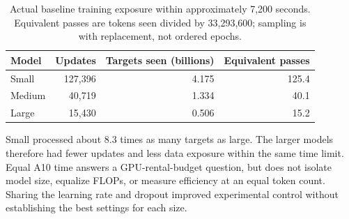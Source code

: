 \begin{table}[H]
\centering
\caption{Actual baseline training exposure within approximately 7,200 seconds. Equivalent passes are tokens seen divided by 33,293,600; sampling is with replacement, not ordered epochs.}
\begin{tabular}{lrrr}
\toprule Model & Updates & Targets seen (billions) & Equivalent passes\\\midrule
Small & 127,396 & 4.175 & 125.4\\
Medium & 40,719 & 1.334 & 40.1\\
Large & 15,430 & 0.506 & 15.2\\\bottomrule
\end{tabular}
\end{table}

Small processed about 8.3 times as many targets as large. The larger models therefore had fewer updates and less data exposure within the same time limit. Equal A10 time answers a GPU-rental-budget question, but does not isolate model size, equalize FLOPs, or measure efficiency at an equal token count. Sharing the learning rate and dropout improved experimental control without establishing the best settings for each size.
